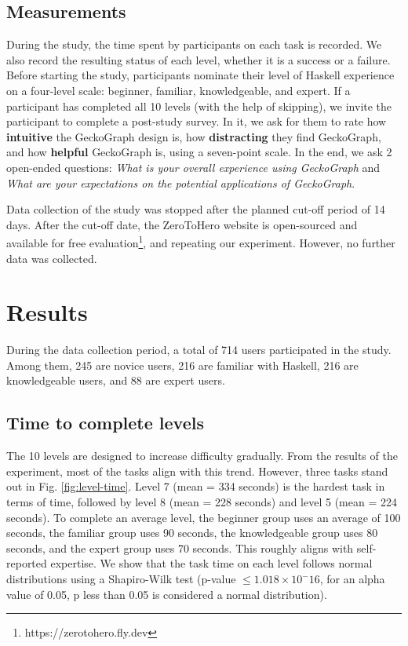 \documentclass[preprint,12pt]{elsarticle}
\begin{document}
\subsection{Measurements}
During the study, the time spent by participants on each task is recorded. We also record the resulting status of each level, whether it is a success or a failure. Before starting the study, participants nominate their level of Haskell experience on a four-level scale: beginner, familiar,  knowledgeable, and expert.  If a participant has completed all 10 levels (with the help of skipping), we invite the participant to complete a post-study survey. In it, we ask for them to rate how {\bf intuitive} the GeckoGraph design is, how {\bf distracting} they find GeckoGraph, and how {\bf helpful} GeckoGraph is, using a seven-point scale. In the end, we ask 2 open-ended questions: {\it What is your overall experience using GeckoGraph} and {\it What are your expectations on the potential applications of GeckoGraph}.

Data collection of the study was stopped after the planned cut-off period of 14 days. After the cut-off date, the ZeroToHero website is open-sourced and available for free evaluation\footnote{https://zerotohero.fly.dev}, and repeating our experiment. However, no further data was collected. 

\section{Results} \label{sec:results}

During the data collection period, a total of 714 users participated in the study. Among them, 245 are novice users, 216 are familiar with Haskell, 216 are knowledgeable users, and 88 are expert users. 

\subsection{Time to complete levels}

The 10 levels are designed to increase difficulty gradually. From the results of the experiment, most of the tasks align with this trend. However, three tasks stand out in Fig. \ref{fig:level-time}.  Level 7 (mean = 334 seconds) is the hardest task in terms of time, followed by level 8 (mean = 228 seconds) and level 5 (mean = 224 seconds). To complete an average level, the beginner group uses an average of 100 seconds, the familiar group uses 90 seconds, the knowledgeable group uses 80 seconds, and the expert group uses 70 seconds. This roughly aligns with self-reported expertise. We show that the task time on each level follows normal distributions using a Shapiro-Wilk test \cite{Shaphiro1965-dx} (p-value  $ \leq 1.018 \times 10^-16$, for an alpha value of 0.05, p less than 0.05 is considered a normal distribution).
\end{document}
